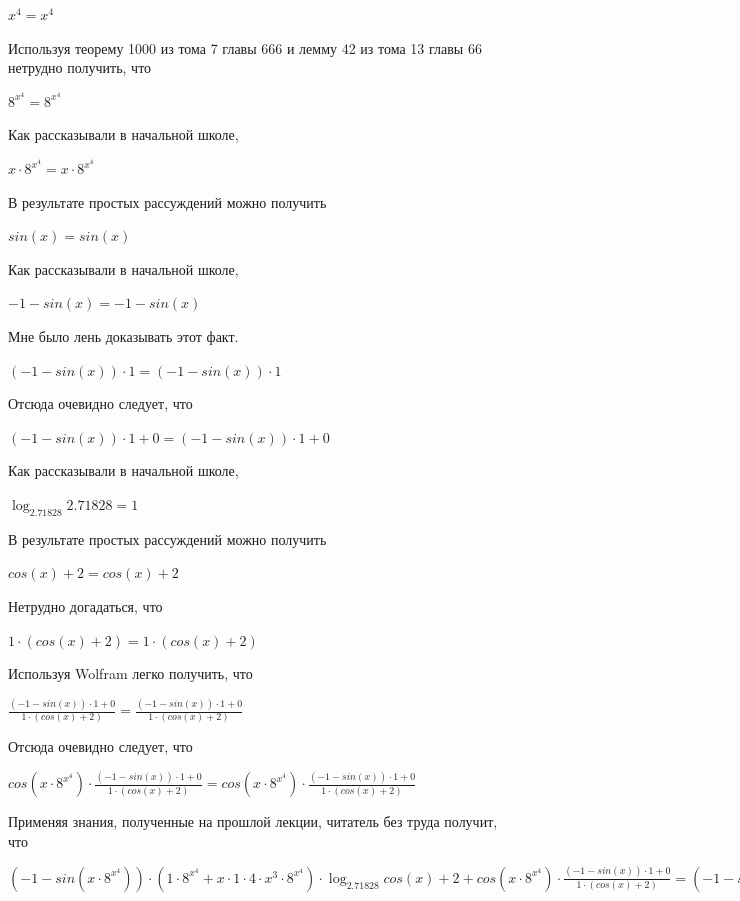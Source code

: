 \documentclass[12pt,a4paper,fleqn]{article}
\theoremstyle{definition}
\begin{document}
${ x }^{ 4 } = { x }^{ 4 }$

Используя теорему 1000 из тома 7 главы 666 и лемму 42 из тома 13 главы 66 нетрудно получить, что 

${ 8 }^{{ x }^{ 4 }} = { 8 }^{{ x }^{ 4 }}$

Как рассказывали в начальной школе, 

$ x  \cdot { 8 }^{{ x }^{ 4 }} =  x  \cdot { 8 }^{{ x }^{ 4 }}$

В результате простых рассуждений можно получить 

$sin( x ) = sin( x )$

Как рассказывали в начальной школе, 

$ -1  - sin( x ) =  -1  - sin( x )$

Мне было лень доказывать этот факт.

$( -1  - sin( x )) \cdot  1  = ( -1  - sin( x )) \cdot  1 $

Отсюда очевидно следует, что 

$( -1  - sin( x )) \cdot  1  +  0  = ( -1  - sin( x )) \cdot  1  +  0 $

Как рассказывали в начальной школе, 

$\log_{ 2.71828 }{ 2.71828 } =  1 $

В результате простых рассуждений можно получить 

$cos( x ) +  2  = cos( x ) +  2 $

Нетрудно догадаться, что 

$ 1  \cdot (cos( x ) +  2 ) =  1  \cdot (cos( x ) +  2 )$

Используя Wolfram легко получить, что 

$\frac{( -1  - sin( x )) \cdot  1  +  0 }{ 1  \cdot (cos( x ) +  2 )}
 = \frac{( -1  - sin( x )) \cdot  1  +  0 }{ 1  \cdot (cos( x ) +  2 )}
$

Отсюда очевидно следует, что 

$cos( x  \cdot { 8 }^{{ x }^{ 4 }}) \cdot \frac{( -1  - sin( x )) \cdot  1  +  0 }{ 1  \cdot (cos( x ) +  2 )}
 = cos( x  \cdot { 8 }^{{ x }^{ 4 }}) \cdot \frac{( -1  - sin( x )) \cdot  1  +  0 }{ 1  \cdot (cos( x ) +  2 )}
$

Применяя знания, полученные на прошлой лекции, читатель без труда получит, что 

$( -1  - sin( x  \cdot { 8 }^{{ x }^{ 4 }})) \cdot ( 1  \cdot { 8 }^{{ x }^{ 4 }} +  x  \cdot  1  \cdot  4  \cdot { x }^{ 3 } \cdot { 8 }^{{ x }^{ 4 }}) \cdot \log_{ 2.71828 }{cos( x ) +  2 } + cos( x  \cdot { 8 }^{{ x }^{ 4 }}) \cdot \frac{( -1  - sin( x )) \cdot  1  +  0 }{ 1  \cdot (cos( x ) +  2 )}
 = ( -1  - sin( x  \cdot { 8 }^{{ x }^{ 4 }})) \cdot ( 1  \cdot { 8 }^{{ x }^{ 4 }} +  x  \cdot  1  \cdot  4  \cdot { x }^{ 3 } \cdot { 8 }^{{ x }^{ 4 }}) \cdot \log_{ 2.71828 }{cos( x ) +  2 } + cos( x  \cdot { 8 }^{{ x }^{ 4 }}) \cdot \frac{( -1  - sin( x )) \cdot  1  +  0 }{ 1  \cdot (cos( x ) +  2 )}
$
\end{document}
